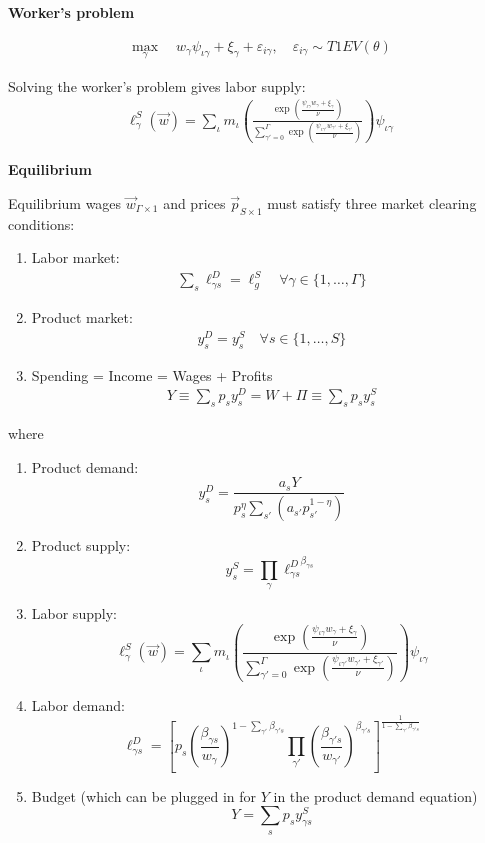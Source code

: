 \documentclass[12pt]{article}
\def\ig{\iota\gamma}
\def\g{\gamma}
\def\i{\iota}
\theoremstyle{definition}
\theoremstyle{plain}
\def\ve{\varepsilon}
\begin{document}
\textbf{Worker's problem}

\begin{align*}
\max_{\g} \quad w_{\g} \psi_{\ig} + \xi_{\g} + \ve_{i\g}, \quad \ve_{i\g} \sim T1EV(\theta)
\end{align*}

Solving the worker's problem gives labor supply:
\begin{align}
\ell_{\g}^S(\vec{w})  = \sum_{\i} m_{\i} \left( \frac{\exp \left( \frac{\psi_{\ig} w_{\g} + \xi_{\g}}{\nu} \right) }{ \sum\limits_{\g'=0}^{\Gamma} \exp \left( \frac{\psi_{\ig'} w_{\g'} + \xi_{\g'}}{\nu} \right) } \right) \psi_{\ig} \label{eq:labor_supply}
\end{align}



\textbf{Equilibrium}

Equilibrium wages $\vec{w}_{\Gamma \times 1}$ and prices $\vec{p}_{S \times 1}$ must satisfy three market clearing conditions:
\begin{enumerate}
	\item Labor market:
	\begin{align*}
	\sum_s \ell_{\g s}^D = \ell_{g}^S \quad \forall \g\in\{1,\dots,\Gamma\}
	\end{align*}
	\item Product market:
	\begin{align*}
	y_s^D = y_s^S  \quad \forall s \in \{1,\dots,S \}
	\end{align*}
	\item Spending = Income = Wages + Profits
	\begin{align*}
	Y \equiv  \sum_s p_s y_s^D = W + \Pi \equiv \sum_s p_s y_s^S
	\end{align*}
\end{enumerate}
where
\begin{enumerate}
	\item Product demand:
	\[ y_s^D = \frac{ a_s Y}{p_s^{\eta} \sum_{s'} \left(a_{s'} p_{s'}^{1-\eta}\right)} \]
	\item Product supply:
	\[ y_s^S = \prod_{\g} {\ell_{\g s}^D}^{\beta_{\g s}} \]
	\item Labor supply:
	\[ \ell_{\g}^S(\vec{w})  = \sum_{\i} m_{\i} \left( \frac{\exp \left( \frac{\psi_{\ig} w_{\g} + \xi_{\g}}{\nu} \right) }{ \sum\limits_{\g'=0}^{\Gamma} \exp \left( \frac{\psi_{\ig'} w_{\g'} + \xi_{\g'}}{\nu} \right) } \right) \psi_{\ig}  \]
	\item Labor demand:
	\[ \ell_{\g s}^D = \left[ p_s \left( \frac{\beta_{\g s}}{w_{\g}} \right)^{1-\sum_{\g'} \beta_{\g' s}} \prod_{\g'} \left(\frac{\beta_{\g' s}}{w_{\g'}} \right)^{\beta_{\g' s}} \right]^{\frac{1}{1-\sum_{\g'} \beta_{\g' s}}} \]
	\item Budget (which can be plugged in for $Y$ in the product demand equation)
	\[ Y = \sum_s p_s y_{\g s}^S \]
\end{enumerate}
\end{document}
